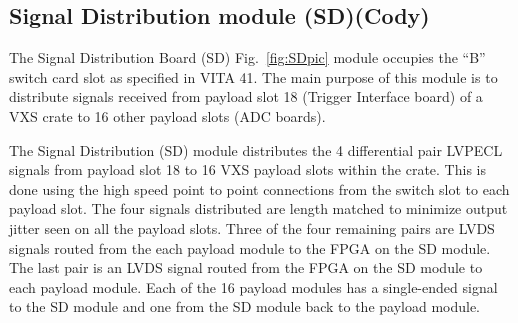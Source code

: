 
	
\subsection{Signal Distribution module (SD)(Cody)}

The Signal Distribution Board (SD) Fig.~\ref{fig:SDpic} module occupies the “B” switch card slot as specified in VITA 41. The main purpose of this module is to distribute signals received from payload slot 18 (Trigger Interface board) of a VXS crate to 16 other payload slots (ADC boards).

The Signal Distribution (SD) module distributes the 4 differential pair LVPECL signals from payload slot 18 to 16 VXS payload slots within the crate. This is done using the high speed point to point connections from the switch slot to each payload slot. The four signals distributed are length matched to minimize output jitter seen on all the payload slots. Three of the four remaining pairs are LVDS signals routed from the each payload module to the FPGA on the SD module. The last pair is an LVDS signal routed from the FPGA on the SD module to each payload module. Each of the 16 payload modules has a single-ended signal to the SD module and one from the SD module back to the payload module.

